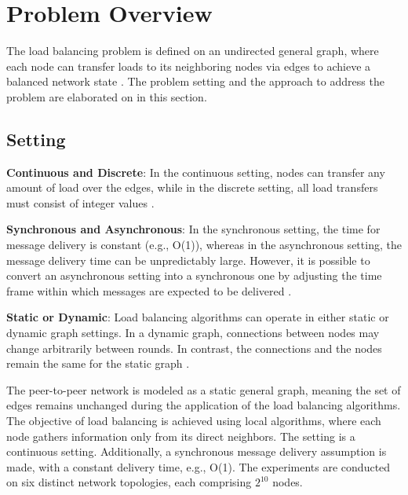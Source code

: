 \chapter{Problem Overview}\label{chap:problemoverview}
The load balancing problem is defined on an undirected general graph, where each node can transfer loads to its neighboring nodes via edges to achieve a balanced network state \cite{Dinitz2023DAB}. The problem setting and the approach to address the problem are elaborated on in this section.

\section{Setting}\label{sec:setting}
\textbf{Continuous and Discrete}: In the continuous setting, nodes can transfer any amount of load over the edges, while in the discrete setting, all load transfers must consist of integer values \cite{Dinitz2023DAB}.

\textbf{Synchronous and Asynchronous}:  In the synchronous setting, the time for message delivery is constant (e.g., O(1)), whereas in the asynchronous setting, the message delivery time can be unpredictably large. However, it is possible to convert an asynchronous setting into a synchronous one by adjusting the time frame within which messages are expected to be delivered \cite{Dinitz2023DAB}.

\textbf{Static or Dynamic}: Load balancing algorithms can operate in either static or dynamic graph settings. In a dynamic graph, connections between nodes may change arbitrarily between rounds. In contrast, the connections and the nodes remain the same for the static graph \cite{Dinitz2023DAB}.

The peer-to-peer network is modeled as a static general graph, meaning the set of edges remains unchanged during the application of the load balancing algorithms. The objective of load balancing is achieved using local algorithms, where each node gathers information only from its direct neighbors. The setting is a continuous setting. Additionally, a synchronous message delivery assumption is made, with a constant delivery time, e.g., O(1). The experiments are conducted on six distinct network topologies, each comprising $2^{10}$ nodes.

